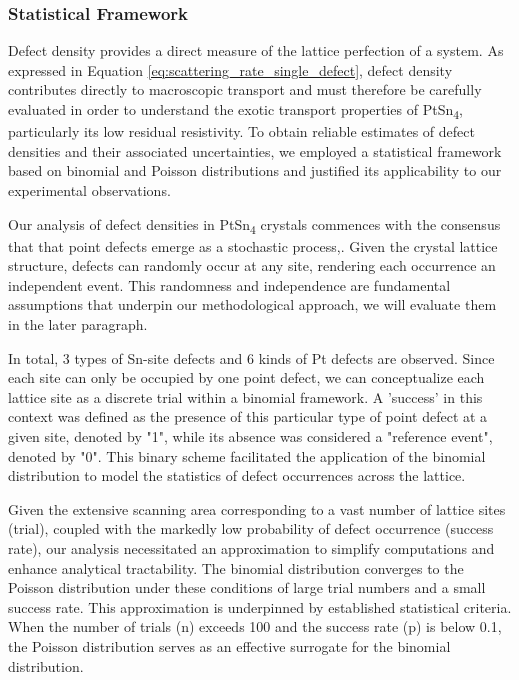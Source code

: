 \subsubsection{Statistical Framework}
Defect density provides a direct measure of the lattice perfection of a system. As expressed in Equation \ref{eq:scattering_rate_single_defect}, defect density contributes directly to macroscopic transport and must therefore be carefully evaluated in order to understand the exotic transport properties of PtSn\textsubscript{4}, particularly its low residual resistivity. To obtain reliable estimates of defect densities and their associated uncertainties, we employed a statistical framework based on binomial and Poisson distributions and justified its applicability to our experimental observations.
\par Our analysis of defect densities in PtSn\textsubscript{4} crystals commences with the consensus that that point defects emerge as a stochastic process\cite{rudolphDefectFormationCrystal2010},\cite{mosquera-loisImperfectionsAreNot2023}. Given the crystal lattice structure, defects can randomly occur at any site, rendering each occurrence an independent event. This randomness and independence are fundamental assumptions that underpin our methodological approach, we will evaluate them in the later paragraph.  
\par In total, 3 types of Sn-site defects and 6 kinds of Pt defects are observed. Since each site can only be occupied by one point defect, we can conceptualize each lattice site as a discrete trial within a binomial framework. A 'success' in this context was defined as the presence of this particular type of point defect at a given site, denoted by "1", while its absence was considered a "reference event", denoted by "0". This binary scheme facilitated the application of the binomial distribution to model the statistics of defect occurrences across the lattice.
\par Given the extensive scanning area corresponding to a vast number of lattice sites (trial), coupled with the markedly low probability of defect occurrence (success rate), our analysis necessitated an approximation to simplify computations and enhance analytical tractability. The 
binomial distribution converges to the Poisson distribution under these conditions of large trial numbers and a small success rate. This approximation is underpinned by established statistical criteria. When the number of trials (n) exceeds 100 and the success rate (p) is below 0.1, the Poisson distribution serves as an effective surrogate for the binomial distribution. 
